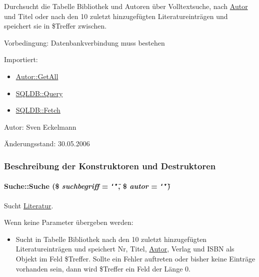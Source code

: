 Durchsucht die Tabelle Bibliothek und Autoren über Volltextsuche, nach \hyperlink{classAutor}{Autor} und Titel oder nach den 10 zuletzt hinzugefügten Literatureinträgen und speichert sie in \$Treffer zwischen. \begin{Desc}
\item[Vorbedingung:]Datenbankverbindung muss bestehen \end{Desc}
\begin{Desc}
\item[Importiert:]\begin{itemize}
\item \hyperlink{classAutor_79cd90084cab240919a5daecf39156a7}{Autor::Get\-All}\item \hyperlink{classSQLDB_fc6ffa8df50f68f07d9f5e3385b96d7a}{SQLDB::Query}\item \hyperlink{classSQLDB_a55c00ce1de0e50e0a58cae61892ba35}{SQLDB::Fetch}\end{itemize}
\end{Desc}
\begin{Desc}
\item[Autor:]Sven Eckelmann \end{Desc}
\begin{Desc}
\item[Änderungsstand:]30.05.2006 \end{Desc}




\subsubsection{Beschreibung der Konstruktoren und Destruktoren}
\hypertarget{classSuche_277cd59d3689d6f0875d114be0024935}{
\paragraph[Suche]{\setlength{\rightskip}{0pt plus 5cm}Suche::Suche (\$ {\em suchbegriff} = {\tt \char`\"{}\char`\"{}}, \$ {\em autor} = {\tt \char`\"{}\char`\"{}})}\hfill}
\label{classSuche_277cd59d3689d6f0875d114be0024935}


Sucht \hyperlink{classLiteratur}{Literatur}. 

Wenn keine Parameter übergeben werden:\begin{itemize}
\item Sucht in Tabelle Bibliothek nach den 10 zuletzt hinzugefügten Literatureinträgen und speichert Nr, Titel, \hyperlink{classAutor}{Autor}, Verlag und ISBN als Objekt im Feld \$Treffer. Sollte ein Fehler auftreten oder bisher keine Einträge vorhanden sein, dann wird \$Treffer ein Feld der Länge 0.\end{itemize}


